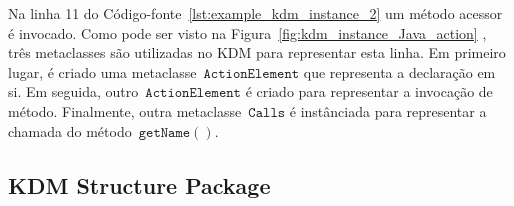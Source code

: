 
Na linha 11 do Código-fonte~\ref{lst:example_kdm_instance_2}  um método acessor é invocado. Como pode ser visto na Figura~\ref{fig:kdm_instance_Java_action} , três metaclasses são utilizadas no KDM para representar esta linha. Em primeiro lugar, é criado uma metaclasse~$\mathtt{ActionElement}$ que representa a declaração em si. Em seguida, outro~$\mathtt{ActionElement}$ é criado para representar a invocação de método. Finalmente, outra metaclasse~$\mathtt{Calls}$ é instânciada para representar a chamada do método~$\mathtt{getName()}$.



\subsection{KDM Structure Package}\label{sec:actionPackage}

